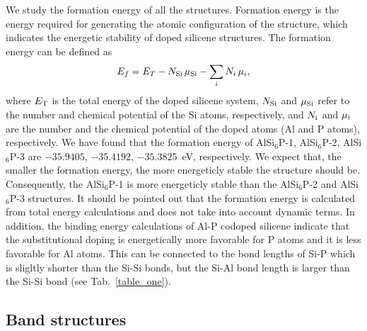 \documentclass[5p,twocolumn]{elsarticle}
\def\tab#1{Tab.\ \ref{#1}}
\begin{document}
We study the formation energy of all the structures. Formation energy is the energy required for generating the atomic configuration of the structure, which indicates the energetic stability of doped silicene structures. The formation energy can be defined as
%
\begin{equation}
E_f = E_T - N_{\rm Si} \, \mu_{\rm Si} - \sum_i N_i \, \mu_i, 
\end{equation} 
%
where $E_{\rm T}$ is the total energy of the doped silicene system, $N_{\rm Si}$ and $\mu_{\rm Si}$ refer to the number and chemical potential of the Si atoms, respectively, and $N_{\rm i}$ and $\mu_{\rm i}$ are the number and the chemical potential of the doped atoms (Al and P atoms), respectively.
We have found that the formation energy of AlSi$_6$P-1, AlSi$_6$P-2, AlSi$_6$P-3 are 
$-35.9405$, $-35.4192$, $-35.3825$~eV, respectively.
We expect that, the smaller the formation energy, the more energeticly stable the structure should be. Consequently, the AlSi$_6$P-1 is more energeticly stable than the  AlSi$_6$P-2 and AlSi$_6$P-3 structures. It should be pointed out that the formation energy
is calculated from total energy calculations and does not
take into account dynamic terms.
In addition, the binding energy calculations of Al-P codoped silicene indicate that 
the substitutional doping is energetically more favorable for P atoms and it is less favorable for Al atoms. This can be connected to the bond lengths of Si-P which is sligltly shorter than the Si-Si bonds, but the Si-Al bond length is larger than the 
Si-Si bond (see \tab{table_one})\cite{HERNANDEZCOCOLETZI2018242}.  





\subsection{Band structures}
\end{document}
